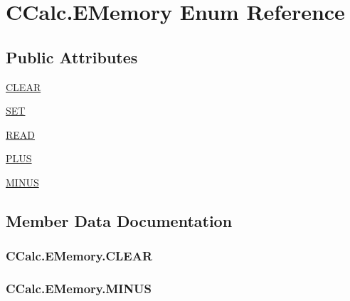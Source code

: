 \hypertarget{enum_c_calc_1_1_e_memory}{}\section{C\+Calc.\+E\+Memory Enum Reference}
\label{enum_c_calc_1_1_e_memory}
\subsection*{Public Attributes}
\begin{DoxyCompactItemize}
\item 
\hyperlink{enum_c_calc_1_1_e_memory_a0c38913961a80443c70fab2bc5122d4b}{C\+L\+E\+AR}
\item 
\hyperlink{enum_c_calc_1_1_e_memory_a60c0f6a1e290b2746e1c29ac9cda4bfe}{S\+ET}
\item 
\hyperlink{enum_c_calc_1_1_e_memory_a5a35ec9df2568ed891a4dd1e94350f63}{R\+E\+AD}
\item 
\hyperlink{enum_c_calc_1_1_e_memory_a670fd8f9c016945af42b1eb328227d1d}{P\+L\+US}
\item 
\hyperlink{enum_c_calc_1_1_e_memory_ae0bc6ef5370f7faa36d5a37b0e43b106}{M\+I\+N\+US}
\end{DoxyCompactItemize}


\subsection{Member Data Documentation}
\subsubsection[{\texorpdfstring{C\+L\+E\+AR}{CLEAR}}]{\setlength{\rightskip}{0pt plus 5cm}C\+Calc.\+E\+Memory.\+C\+L\+E\+AR}\hypertarget{enum_c_calc_1_1_e_memory_a0c38913961a80443c70fab2bc5122d4b}{}\label{enum_c_calc_1_1_e_memory_a0c38913961a80443c70fab2bc5122d4b}
\subsubsection[{\texorpdfstring{M\+I\+N\+US}{MINUS}}]{\setlength{\rightskip}{0pt plus 5cm}C\+Calc.\+E\+Memory.\+M\+I\+N\+US}\hypertarget{enum_c_calc_1_1_e_memory_ae0bc6ef5370f7faa36d5a37b0e43b106}{}\label{enum_c_calc_1_1_e_memory_ae0bc6ef5370f7faa36d5a37b0e43b106}
